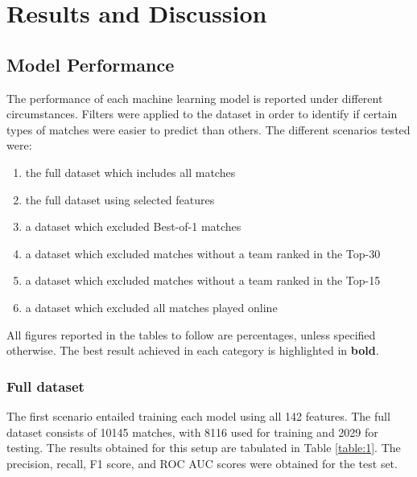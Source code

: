 \chapter{Results and Discussion}
\label{Results}

\section{Model Performance}

The performance of each machine learning model is reported under different circumstances. Filters were applied to the dataset in order to identify if certain types of matches were easier to predict than others. The different scenarios tested were:
\begin{enumerate}
	\item the full dataset which includes all matches
	\item the full dataset using selected features
	\item a dataset which excluded Best-of-1 matches
	\item a dataset which excluded matches without a team ranked in the Top-30
	\item a dataset which excluded matches without a team ranked in the Top-15
	\item a dataset which excluded all matches played online
\end{enumerate}

All figures reported in the tables to follow are percentages, unless specified otherwise. The best result achieved in each category is highlighted in \textbf{bold}.

\subsection{Full dataset}

The first scenario entailed training each model using all 142 features. The full dataset consists of 10145 matches, with 8116 used for training and 2029 for testing. The results obtained for this setup are tabulated in Table \ref{table:1}. The precision, recall, F1 score, and ROC AUC scores were obtained for the test set.

